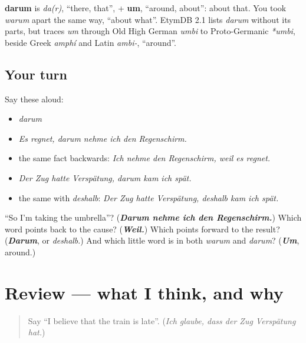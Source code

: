 \begin{cousinweb}
\textbf{darum} is \emph{da(r)}, \textquotedblleft{}there, that\textquotedblright{}, + \textbf{um}, \textquotedblleft{}around, about\textquotedblright{}: about that. You took \emph{warum} apart the same way, \textquotedblleft{}about what\textquotedblright{}. EtymDB 2.1 lists \emph{darum} without its parts, but traces \emph{um} through Old High German \emph{umbi} to Proto-Germanic \emph{*umbi}, beside Greek \emph{amphí} and Latin \emph{ambi-}, \textquotedblleft{}around\textquotedblright{}.
\end{cousinweb}

\subsection*{Your turn}
Say these aloud:

\begin{itemize}
\raggedright
  \item \emph{darum}
  \item \emph{Es regnet, darum nehme ich den Regenschirm.}
  \item the same fact backwards: \emph{Ich nehme den Regenschirm, weil es regnet.}
  \item \emph{Der Zug hatte Verspätung, darum kam ich spät.}
  \item the same with \emph{deshalb}: \emph{Der Zug hatte Verspätung, deshalb kam ich spät.}
\end{itemize}

\begin{tcolorbox}[breakable,colback=teal!4,colframe=teal!35!black,title={Before you move on}]
\textquotedblleft{}So I'm taking the umbrella\textquotedblright{}? (\emph{\textbf{Darum nehme ich den Regenschirm.}}) Which word points back to the cause? (\emph{\textbf{Weil.}}) Which points forward to the result? (\emph{\textbf{Darum}}, or \emph{deshalb}.) And which little word is in both \emph{warum} and \emph{darum}? (\emph{\textbf{Um}}, around.)
\end{tcolorbox}
\section[(review)]{Review — what I think, and why}

\label{lesson:GE-C254-review}



\begin{quote}
Say \textquotedblleft{}I believe that the train is late\textquotedblright{}. (\emph{Ich glaube, dass der Zug Verspätung hat.})
\end{quote}


